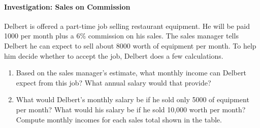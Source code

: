 \documentclass[10pt,]{book}
\theoremstyle{plain}
\theoremstyle{definition}
\theoremstyle{definition}
\theoremstyle{definition}
\theoremstyle{definition}
\theoremstyle{definition}
\numberwithin{equation}{section}
\newcommand{\hrulethin}  {\noalign{\hrule height 0.04em}}
\newcommand{\hrulethick} {\noalign{\hrule height 0.11em}}
\newcounter{figstack}
\newlength\fight
\newcommand\pushValignCaptionBottom[5][b]{%
\stepcounter{figstack}%
\expandafter\def\csname %
figalign\romannumeral\value{figstack}\endcsname{#1}%
\expandafter\def\csname %
figtype\romannumeral\value{figstack}\endcsname{#2}%
\expandafter\def\csname %
figwd\romannumeral\value{figstack}\endcsname{#3}%
\expandafter\def\csname %
figcontent\romannumeral\value{figstack}\endcsname{#4}%
\expandafter\def\csname %
figcap\romannumeral\value{figstack}\endcsname{#5}%
\setbox0=\hbox{%
\begin{#2}{#3}#4\end{#2}}%
\ifdim\dimexpr\ht0+\dp0\relax>\fight\global\setlength{\fight}{%
\dimexpr\ht0+\dp0\relax}\fi%
}
\begin{document}
\paragraph[Investigation: Sales on Commission]{Investigation: Sales on Commission}\label{paragraphs-1}
Delbert is offered a part-time job selling restaurant equipment. He will be paid \textdollar{}1000 per month plus a 6\% commission on his sales. The sales manager tells Delbert he can expect to sell about \textdollar{}8000 worth of equipment per month. To help him decide whether to accept the job, Delbert does a few calculations.%
\par

                \leavevmode%
\begin{enumerate}
\item\hypertarget{li-1}{}Based on the sales manager’s estimate, what monthly income can Delbert expect from this job? What annual salary would that provide?%
\item\hypertarget{li-2}{}What would Delbert’s monthly salary be if he sold only \textdollar{}5000 of equipment per month? What would his salary be if he sold \textdollar{}10,000 worth per month? Compute monthly incomes for each sales total shown in the table.%
\leavevmode%
\end{enumerate}
\end{document}
